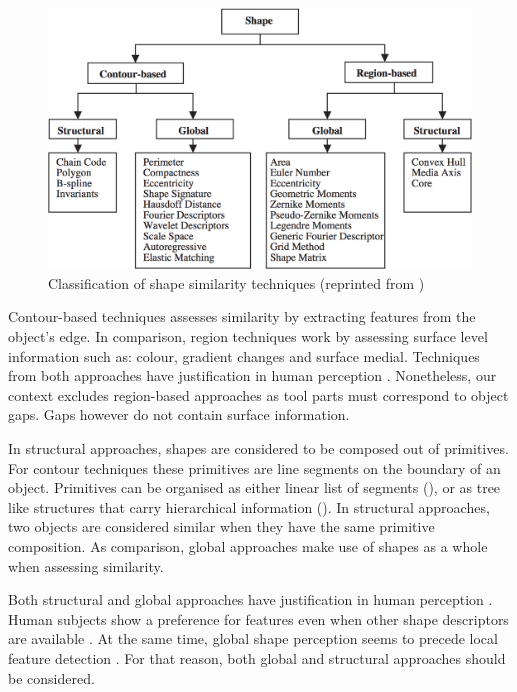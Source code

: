 \documentclass[11]{article}
\begin{document}
\begin{figure}[h]
  \centering
  \includegraphics[width=1\textwidth]{figures/similarity_techniques.png}
  \caption{Classification of shape similarity techniques (reprinted from \cite{zhang2004})}
  \label{fig:shape_similarity}
\end{figure}  

Contour-based techniques assesses similarity by extracting features from the object's edge.
In comparison, region techniques work by assessing surface level information such as: colour, gradient changes and surface medial.
Techniques from both approaches have justification in human perception \cite{chatbri2016}.
Nonetheless, our context excludes region-based approaches as tool parts must correspond to object gaps.
Gaps however do not contain surface information. 

In structural approaches, shapes are considered to be composed out of primitives. For contour techniques these primitives are line segments on the boundary of an object.
Primitives can be organised as either linear list of segments (\cite{zhang2004}), or as tree like structures that carry hierarchical information (\cite{zhu2015}).
In structural approaches, two objects are considered similar when they have the same primitive composition.
As comparison, global approaches make use of shapes as a whole when assessing similarity. 

Both structural and global approaches have justification in human perception \cite{zhang2004}.
Human subjects show a preference for features even when other shape descriptors are available \cite{chatbri2016}.
At the same time, global shape perception seems to precede local feature detection \cite{navon1977}. 
For that reason, both global and structural approaches should be considered. 
\end{document}
